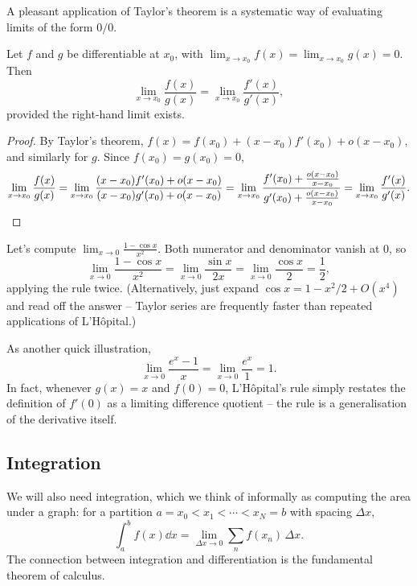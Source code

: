 A pleasant application of Taylor's theorem is a systematic way of evaluating limits of the form $0/0$.

\begin{theorem}
	Let $f$ and $g$ be differentiable at $x_0$, with
	$\lim_{x \to x_0} f(x) = \lim_{x \to x_0} g(x) = 0$. Then
	$$
	\lim_{x \to x_0} \frac{f(x)}{g(x)} = \lim_{x \to x_0} \frac{f'(x)}{g'(x)},
	$$
	provided the right-hand limit exists.
\end{theorem}
\begin{proof}
	By Taylor's theorem, $f(x) = f(x_0) + (x - x_0) f'(x_0) + o(x - x_0)$, and similarly for $g$. Since $f(x_0) = g(x_0) = 0$,
	$$
	\lim_{x \to x_0} \frac{f(x)}{g(x)}
	= \lim_{x \to x_0} \frac{(x - x_0)f'(x_0) + o(x - x_0)}{(x - x_0)g'(x_0) + o(x - x_0)}
	= \lim_{x \to x_0} \frac{f'(x_0) + \frac{o(x - x_0)}{x - x_0}}{g'(x_0) + \frac{o(x - x_0)}{x - x_0}}
	= \lim_{x \to x_0} \frac{f'(x)}{g'(x)}. \qedhere
	$$
\end{proof}

\begin{example}
	Let's compute $\lim_{x \to 0} \frac{1 - \cos x}{x^2}$. Both numerator and denominator vanish at $0$, so
	$$
	\lim_{x \to 0} \frac{1 - \cos x}{x^2} = \lim_{x \to 0} \frac{\sin x}{2x} = \lim_{x \to 0} \frac{\cos x}{2} = \frac{1}{2},
	$$
	applying the rule twice. (Alternatively, just expand $\cos x = 1 - x^2/2 + O(x^4)$ and read off the answer -- Taylor series are frequently faster than repeated applications of L'H\^opital.)
\end{example}

\begin{example}
	As another quick illustration,
	$$
	\lim_{x \to 0} \frac{e^x - 1}{x} = \lim_{x \to 0}\frac{e^x}{1} = 1.
	$$
	In fact, whenever $g(x) = x$ and $f(0) = 0$, L'H\^opital's rule simply restates the definition of $f'(0)$ as a limiting difference quotient -- the rule is a generalisation of the derivative itself.
\end{example}

\subsection{Integration}

We will also need integration, which we think of informally as computing the area under a graph: for a partition $a = x_0 < x_1 < \cdots < x_N = b$ with spacing $\Delta x$,
$$
\int_a^b f(x) \dd x = \lim_{\Delta x \to 0} \sum_{n} f(x_n) \, \Delta x.
$$
The connection between integration and differentiation is the fundamental theorem of calculus.

